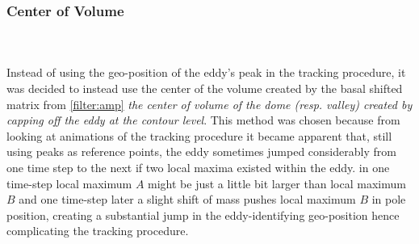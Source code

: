 \subsubsection{Center of Volume}
\\
\\
Instead of using the geo-position of the eddy's peak in the tracking procedure,
it was decided to instead use the center of the volume created by the basal
shifted matrix from \ref{filter:amp} \ie \textit{the center of volume of the
dome
(resp. valley) created by capping off the eddy at the contour level}.
This method was chosen because from looking at animations of the tracking
procedure
it became apparent that, still using peaks as reference points, the eddy
sometimes jumped considerably from one time step to the next if two local maxima
existed within the eddy. \Eg in one time-step local maximum $A$ might be just a
little bit larger than local maximum $B$ and one time-step later a slight shift
of mass pushes local maximum $B$ in pole position, creating a substantial jump
in the eddy-identifying geo-position hence complicating the tracking procedure. 
